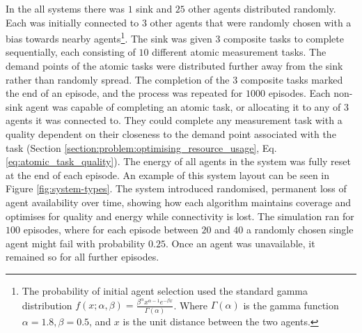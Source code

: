 In the all systems there was  $1$ sink and $25$ other agents distributed randomly. Each was initially connected to $3$ other agents that were randomly chosen with a bias towards nearby agents\footnote{The probability of initial agent selection used the standard gamma distribution $f(x; \alpha, \beta) = \frac{\beta^{\alpha} x^{\alpha-1}e^{- \beta x}}   {\Gamma(\alpha)}$. Where  $\Gamma(\alpha)$ is the  gamma function $\alpha=1.8, \beta=0.5$, and $x$ is the unit distance between the two agents.}. 
The sink was given $3$ composite tasks to complete sequentially, each consisting of $10$ different atomic measurement tasks. The demand points of the atomic tasks were distributed further away from the sink rather than randomly spread. The completion of the $3$ composite tasks marked the end of an episode, and the process was repeated for $1000$ episodes. Each non-sink agent was capable of completing an atomic task, or allocating it to any of $3$ agents it was connected to. They could complete any measurement task with a quality dependent on their closeness to the demand point associated with the task (Section \ref{section:problem:optimising_resource_usage}, Eq. \ref{eq:atomic_task_quality}). The energy of all agents in the system was fully reset at the end of each episode. An example of this system layout can be seen in Figure \ref{fig:system-types}.  The \simulationNodeFailure{}{} system introduced randomised, permanent loss of agent availability over time, showing how each algorithm maintains coverage and optimises for quality and energy while connectivity is lost. The simulation ran for $100$ episodes, where for each episode between $20$ and $40$  a randomly chosen single agent might fail with probability $0.25$. Once an agent was unavailable, it remained so for all further episodes. 

 
